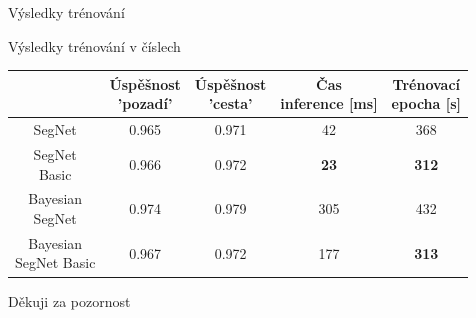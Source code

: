 \documentclass[aspectratio=1610]{beamer}
\begin{document}
\begin{frame}{Výsledky trénování}
\centering
{}
\end{frame}
\begin{frame}{Výsledky trénování v číslech}
\renewcommand{\arraystretch}{1.5}
\begin{table}[h]
	\centering	
	\begin{tabular}{|c|c|c|c|c|}
		\hline
		\thead{Architektura} & \thead{Úspěšnost \\ 'pozadí'} & \thead{Úspěšnost \\ 'cesta'} & \thead{Čas \\ inference [ms] } & \thead{Trénovací \\ epocha [s] }\\		
		\hline	
		SegNet & 0.965 & 0.971 & 42 & 368 \\	
		\hline	
		\makecell{SegNet \\ Basic} & 0.966 & 0.972 & \textbf{23} & \textbf{312} \\	
		\hline	
		\makecell{Bayesian \\ SegNet} & 0.974 & 0.979 & 305 & 432 \\	
		\hline	
		\makecell{Bayesian \\ SegNet Basic} & 0.967 & 0.972 & 177 & \textbf{313} \\
		\hline
	\end{tabular}
\end{table}
\end{frame}
\begin{frame}{}
	\centering
	{\Large Děkuji za pozornost}	
\end{frame}
\end{document}
